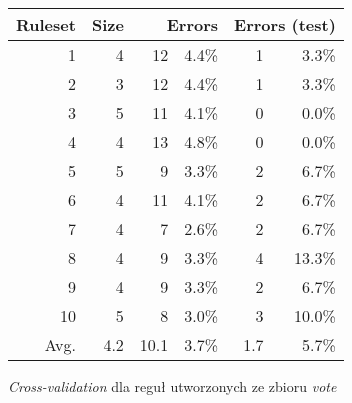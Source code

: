 \begin{figure}
\begin{tabular}{|r|r|rr|rr|}
\hline
 Ruleset & 
 Size & 
 \multicolumn{2}{1|}{Errors} & 
 \multicolumn{2}{1|}{Errors (test)} \\
\hline\hline
       1 &    4 &   12 & 4.4\% &    1 &  3.3\% \\
       2 &    3 &   12 & 4.4\% &    1 &  3.3\% \\
       3 &    5 &   11 & 4.1\% &    0 &  0.0\% \\
       4 &    4 &   13 & 4.8\% &    0 &  0.0\% \\
       5 &    5 &    9 & 3.3\% &    2 &  6.7\% \\
       6 &    4 &   11 & 4.1\% &    2 &  6.7\% \\
       7 &    4 &    7 & 2.6\% &    2 &  6.7\% \\
       8 &    4 &    9 & 3.3\% &    4 & 13.3\% \\
       9 &    4 &    9 & 3.3\% &    2 &  6.7\% \\
      10 &    5 &    8 & 3.0\% &    3 & 10.0\% \\
\hline\hline
    Avg. &  4.2 & 10.1 & 3.7\% &  1.7 &  5.7\% \\
\hline
\end{tabular}
\caption{\emph{Cross-validation} dla reguł utworzonych ze zbioru \emph{vote}}
\label{p2t2-vote-rules-cv}
\end{figure}